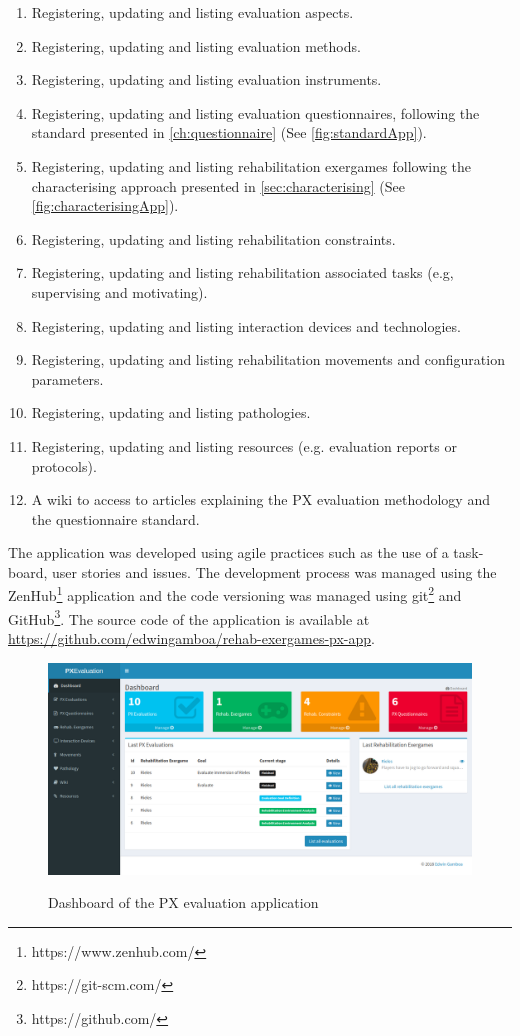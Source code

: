 \begin{enumerate}
    \item Registering, updating and listing evaluation aspects.
    \item Registering, updating and listing evaluation methods.
    \item Registering, updating and listing evaluation instruments.
    \item Registering, updating and listing evaluation questionnaires, following the standard presented in \autoref{ch:questionnaire} (See \autoref{fig:standardApp}).
    \item Registering, updating and listing rehabilitation exergames following the characterising approach presented in \autoref{sec:characterising} (See \autoref{fig:characterisingApp}).
    \item Registering, updating and listing rehabilitation constraints.
    \item Registering, updating and listing rehabilitation associated tasks (e.g, supervising and motivating).
    \item Registering, updating and listing interaction devices and technologies.
    \item Registering, updating and listing rehabilitation movements and configuration parameters.
    \item Registering, updating and listing pathologies.
    \item Registering, updating and listing resources (e.g. evaluation reports or protocols).
    \item A wiki to access to articles explaining the \ac{PX} evaluation methodology and the questionnaire standard.
\end{enumerate}

The application was developed using agile practices such as the use of a task-board, user stories and issues. The development process was managed using the ZenHub\footnote{https://www.zenhub.com/} application and the code versioning was managed using git\footnote{https://git-scm.com/} and GitHub\footnote{https://github.com/}. The source code of the application is available at \url{https://github.com/edwingamboa/rehab-exergames-px-app}.

\begin{figure}[bth]
\myfloatalign
{\includegraphics[width=\linewidth]{gfx/app/dashboardApp}} \quad
\caption{Dashboard of the \ac{PX} evaluation application}\label{fig:dashboardApp}
\end{figure}

